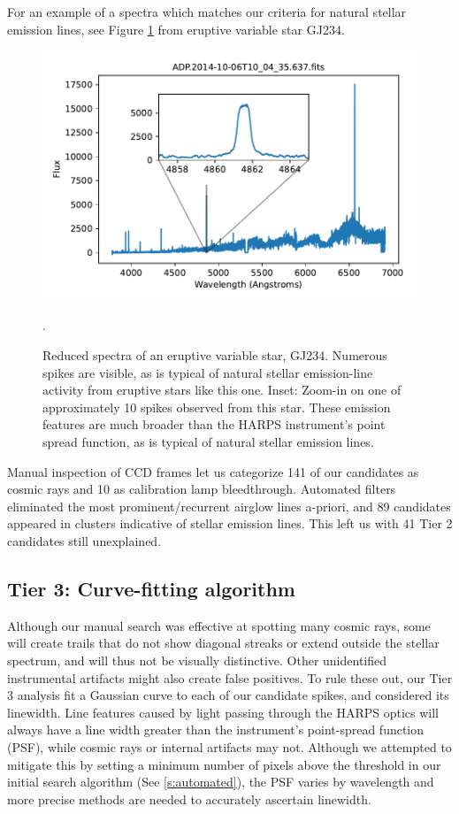 \documentclass[twocolumn]{aastex701}
\begin{document}
For an example of a spectra which matches our criteria for natural stellar emission lines, see Figure \ref{fig:eruptivevariablestar}  from eruptive variable star GJ234.

\begin{figure}
    \centering
    \includegraphics[width=\columnwidth]{clean-figures/eruptivevariablestar.pdf}
    \caption{Reduced spectra of an eruptive variable star, GJ234. Numerous spikes are visible, as is typical of natural stellar emission-line activity from eruptive stars like this one.  Inset: Zoom-in on one of approximately 10 spikes observed from 
    this star. These emission features are much broader than the HARPS instrument's point spread function, as is typical of natural stellar emission lines.}.
    \label{fig:eruptivevariablestar}
\end{figure}

Manual inspection of CCD frames let us categorize 141 of our candidates as cosmic rays and 10 as calibration lamp bleedthrough. Automated filters eliminated the most prominent/recurrent airglow lines a-priori, and 89 candidates appeared in clusters indicative of stellar emission lines. This left us with 41 Tier 2 candidates still unexplained.

\subsection{Tier 3: Curve-fitting algorithm}
\label{s:curvefit}

Although our manual search was effective at spotting many cosmic rays, some will create trails that do not show diagonal streaks or extend outside the stellar spectrum, and will thus not be visually distinctive.  Other unidentified instrumental artifacts might also create false positives.  To rule these out, our Tier 3 analysis fit a Gaussian curve to each of our candidate spikes, and considered its linewidth.  Line features caused by light passing through the HARPS optics will always have a line width greater than the instrument's point-spread function (PSF), while cosmic rays or internal artifacts may not. Although we attempted to mitigate this by setting a minimum number of pixels above the threshold in our initial search algorithm (See \ref{s:automated}), the PSF varies by wavelength and more precise methods are needed to accurately ascertain linewidth.
\end{document}
